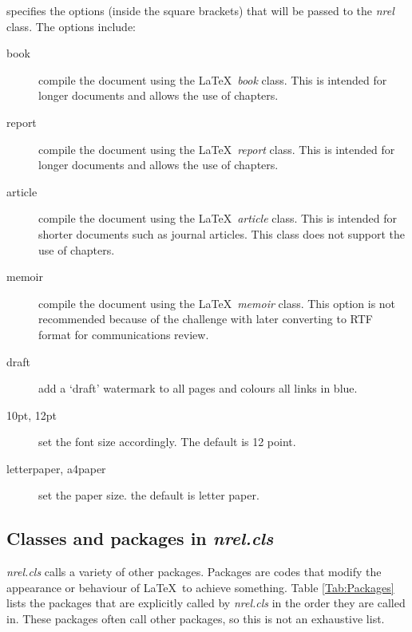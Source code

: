 \documentclass[12pt,letterpaper]{report}
\begin{document}
\noindent specifies the options (inside the square brackets) that will be passed to the \emph{nrel} class. The options include:
\begin{description}
\item[book]{compile the document using the \LaTeX\ \emph{book} class. This is intended for longer documents and allows the use of chapters.}
\item[report]{compile the document using the \LaTeX\ \emph{report} class. This is intended for longer documents and allows the use of chapters.}
\item[article]{compile the document using the \LaTeX\ \emph{article} class. This is intended for shorter documents such as journal articles. This class does not support the use of chapters.}
\item[memoir]{compile the document using the \LaTeX\ \emph{memoir} class. This option is not recommended because of the challenge with later converting to RTF format for communications review.}
\item[draft]{add a `draft' watermark to all pages and colours all links in blue.}
\item[10pt, 12pt]{set the font size accordingly. The default is 12 point.}
\item[letterpaper, a4paper]{set the paper size. the default is letter paper.}
\end{description}

\subsection{Classes and packages in \emph{nrel.cls}}
\emph{nrel.cls} calls a variety of other packages. Packages are codes that modify the appearance or behaviour of \LaTeX\ to achieve something. Table \ref{Tab:Packages} lists the packages that are explicitly called by \emph{nrel.cls} in the order they are called in. These packages often call other packages, so this is not an exhaustive list.
\end{document}
